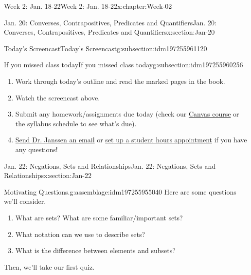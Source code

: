 \documentclass[oneside,10pt,]{book}
\numberwithin{equation}{section}
\begin{document}
\begin{chapterptx}{Week 2: Jan. 18-22}{}{Week 2: Jan. 18-22}{}{}{x:chapter:Week-02}
\begin{sectionptx}{Jan. 20: Converses, Contrapositives, Predicates and Quantifiers}{}{Jan. 20: Converses, Contrapositives, Predicates and Quantifiers}{}{}{x:section:Jan-20}
\begin{subsectionptx}{Today's Screencast}{}{Today's Screencast}{}{}{g:subsection:idm197255961120}
\end{subsectionptx}
%
%
\typeout{************************************************}
\typeout{************************************************}
%
\begin{subsectionptx}{If you missed class today}{}{If you missed class today}{}{}{g:subsection:idm197255960256}
%
\begin{enumerate}
\item{}Work through today's outline and read the marked pages in the book.%
\item{}Watch the screencast above.%
\item{}Submit any homework\slash{}assignments due today (check our \href{https://dordt.instructure.com/courses/3110050}{Canvas course} or the \href{https://prof.mkjanssen.org/ds/index.html\#schedule}{syllabus schedule} to see what's due).%
\item{}\href{mailto:mike.janssen@dordt.edu}{Send Dr. Janssen an email} or \href{https://calendly.com/mkjanssen/student-hours}{set up a student hours appointment} if you have any questions!%
\end{enumerate}
\end{subsectionptx}
\end{sectionptx}
%
%
\typeout{************************************************}
\typeout{************************************************}
%
\begin{sectionptx}{Jan. 22: Negations, Sets and Relationships}{}{Jan. 22: Negations, Sets and Relationships}{}{}{x:section:Jan-22}
\begin{introduction}{}%
\begin{assemblage}{Motivating Questions.}{g:assemblage:idm197255955040}%
Here are some questions we'll consider. %
\begin{enumerate}
\item{}What are sets? What are some familiar\slash{}important sets?%
\item{}What notation can we use to describe sets?%
\item{}What is the difference between elements and subsets?%
\end{enumerate}
 Then, we'll take our first quiz.%
\end{assemblage}
\end{introduction}%
%
%
\typeout{************************************************}
\typeout{************************************************}

\end{sectionptx}
\end{chapterptx}
\end{document}

